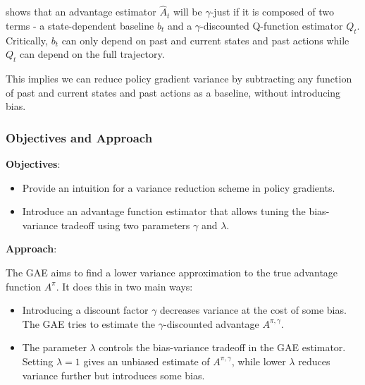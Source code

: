 \documentclass{article}
\begin{document}
 shows that an advantage estimator $\hat{A}_t$ will be $\gamma$-just if it is composed of two terms - a state-dependent baseline $b_t$ and a $\gamma$-discounted Q-function estimator $Q_t$. Critically, $b_t$ can only depend on past and current states and past actions while $Q_t$ can depend on the full trajectory.

This implies we can reduce policy gradient variance by subtracting any function of past and current states and past actions as a baseline, without introducing bias.


\subsubsection{Objectives and Approach}

\noindent \textbf{Objectives}:

\begin{itemize}
\item Provide an intuition for a variance reduction scheme in policy gradients.

\item Introduce an advantage function estimator that allows tuning the bias-variance tradeoff using two parameters $\gamma$ and $\lambda$.
\end{itemize}

\noindent \textbf{Approach}:

The GAE aims to find a lower variance approximation to the true advantage function $A^{\pi}$. It does this in two main ways:

\begin{itemize}
\item Introducing a discount factor $\gamma$ decreases variance at the cost of some bias. The GAE tries to estimate the $\gamma$-discounted advantage $A^{\pi,\gamma}$.

\item The parameter $\lambda$ controls the bias-variance tradeoff in the GAE estimator. Setting $\lambda=1$ gives an unbiased estimate of $A^{\pi,\gamma}$, while lower $\lambda$ reduces variance further but introduces some bias.
\end{itemize}
\end{document}
